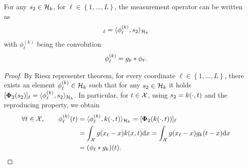             {\color{red}
            \noindent{}
            \begin{proposition}
                For any $s_2 \in \mathcal{H}_k$, for $\ell \in \left\{ 1, \dots, L \right\}$, the measurement operator can be written as
                \begin{equation}
                    [\phih(\fh)]_\ell = \langle \philk , \fh \rangle_{\cHk}
                \end{equation}
                with $\phi_\ell^{(k)}$ being the convolution
                \begin{equation}
                    \phi_\ell^{(k)} = g_k * \phi_\ell.
                \end{equation}
            \end{proposition}
            \begin{proof}
                

                By Riesz representer theorem, for every coordinate  $\ell \in \left\{1, \dots, L \right\}$, there exists an element $\phi_\ell^{(k)} \in \mathcal{H}_k$ such that for any $s_2 \in \mathcal{H}_k$ it holds $[{\bm{\Phi}_2}(s_2)]_\ell = \langle \phi_\ell^{(k)} , s_2 \rangle_{\mathcal{H}_k}$. In particular, for $t \in \mathcal{X}$, using $s_2 = k(\cdot, t)$ and the reproducing property, we obtain
                \begin{align*}
                    \forall t \in \mathcal{X}, \qquad \phi_\ell^{(k)}(t)
                    &= \langle \phi_\ell^{(k)}, k(\cdot, t) \rangle_{\mathcal{H}_k} = [{\bm{\Phi}_2}(k(\cdot, t))]_\ell \\
                    & = \int_{\mathcal{X}} g(x_\ell - x) k(x, t) \mathrm{d}x = \int_{\mathcal{X}} g(x_\ell - x) g_k(t - x) \mathrm{d}x \\
                    & = (\phi_\ell * g_k)(t).
                \end{align*}   
            \end{proof}
            }
            
